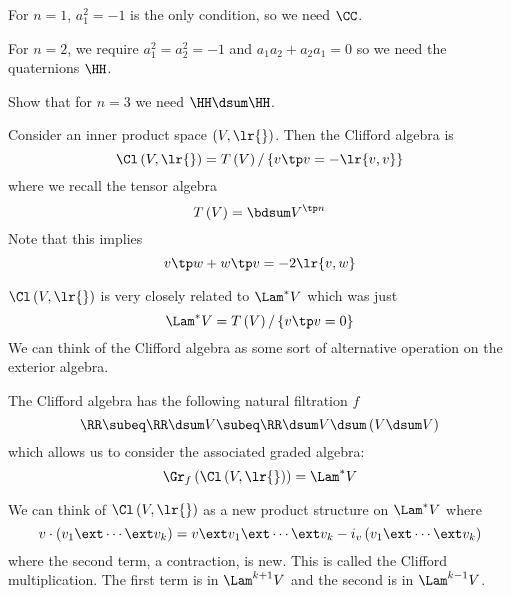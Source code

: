 \documentclass{amsart}
\begin{document}
\begin{exm}
For $n = 1$, $a_1^2 = -1$ is the only condition, so we need $\CC$. 
\end{exm}

\begin{exm}
For $n = 2$, we require $a_1^2 = a_2^2 = -1$ and $a_1 a_2 + a_2a_1 = 0$
so we need the quaternions $\HH$.
\end{exm}

\begin{exr}
Show that for $n = 3$ we need $\HH \dsum \HH$.
\end{exr}

Consider an inner product space $\left( V , \lr{} \right)$. 
Then the Clifford algebra is 
\begin{equation}
\Cl\left( V , \lr{} \right)=
T\left( V \right) / \left\{ v\tp v = - \lr{v,v} \right\}
\end{equation}
where we recall the tensor algebra
\begin{equation}
T\left( V \right)= \bdsum V^{\tp n}
\end{equation}
Note that this implies
\begin{equation}
v\tp w + w \tp v = -2 \lr{v,w}
\end{equation}

\begin{rmk}
$\Cl\left( V , \lr{} \right)$ is very closely related to $\Lam^* V$ which was just
\begin{equation}
\Lam^* V = T\left( V \right) / \left\{ v\tp v = 0 \right\}
\end{equation}
We can think of the Clifford algebra as some sort of alternative operation on the exterior algebra.
\end{rmk}

The Clifford algebra has the following natural filtration $f$
\begin{equation}
\RR \subeq \RR \dsum V \subeq \RR \dsum V \dsum\left( V\dsum V \right)
\end{equation}
which allows us to consider the associated graded algebra:
\begin{equation}
\Gr_f\left( \Cl\left( V , \lr{} \right) \right) = \Lam^* V
\end{equation}

We can think of $\Cl\left( V , \lr{} \right)$ as a new product structure on $\Lam^* V$ where
\begin{equation}
v\cdot \left( v_1 \ext \cdots \ext v_k \right) =
v\ext v_1 \ext \cdots \ext v_k
- i_v \left( v_1 \ext \cdots \ext v_k \right)
\end{equation}
where the second term, a contraction, is new.
This is called the Clifford multiplication.
The first term is in $\Lam^{k+1} V$ and the second is in $\Lam^{k-1} V$.
\end{document}
